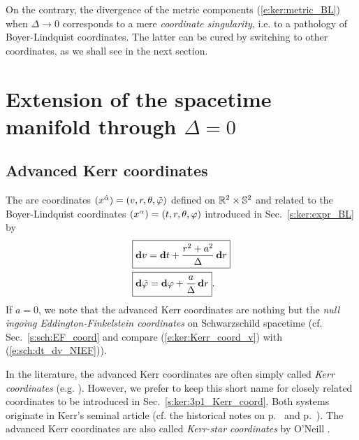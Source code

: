 On the contrary, the divergence
of the metric components (\ref{e:ker:metric_BL})
when $\Delta\rightarrow 0$ corresponds to
a mere \emph{coordinate singularity},
i.e. to a pathology of Boyer-Lindquist coordinates. The latter can be cured by switching to
other coordinates, as we shall see in the next section.


\section{Extension of the spacetime manifold through \texorpdfstring{$\Delta=0$}{Δ=0}}
\label{s:ker:extension}

\subsection{Advanced Kerr coordinates} \label{s:ker:Kerr_coord}

The  are coordinates
$(x^{\hat{\alpha}}) = (v,r,\theta,{\tilde\varphi})$ defined on $\mathbb{R}^2\times\mathbb{S}^2$ and related to the Boyer-Lindquist coordinates
$(x^\alpha) = (t,r,\theta,\varphi)$ introduced in Sec.~\ref{s:ker:expr_BL} by
\begin{subequations}
\label{e:ker:Kerr_coord}
\begin{align}
& \fbox{$\displaystyle \mathbf{d} v = \mathbf{d} t + \frac{r^2+a^2}{\Delta} \, \mathbf{d} r$} \label{e:ker:Kerr_coord_v}\\
& \fbox{$\displaystyle \mathbf{d} {\tilde\varphi} = \mathbf{d} \varphi + \frac{a}{\Delta}\, \mathbf{d} r$} . \label{e:ker:Kerr_coord_tph}
\end{align}
\end{subequations}
If $a=0$, we note that the advanced Kerr coordinates are nothing but the
\emph{null ingoing Eddington-Finkelstein coordinates} on Schwarzschild spacetime
(cf. Sec.~\ref{s:sch:EF_coord} and compare
(\ref{e:ker:Kerr_coord_v}) with (\ref{e:sch:dt_dv_NIEF})).

\begin{remark}
In the literature, the advanced Kerr coordinates are often simply called \emph{Kerr coordinates} (e.g. \cite{MisneTW73,Strau13}). However,
we prefer to keep this short name for closely related coordinates to be introduced in Sec.~\ref{s:ker:3p1_Kerr_coord}.
Both systems originate in Kerr's seminal article \cite{Kerr63} (cf. the historical notes on p.~\pageref{h:ker:Kerr_coord}
and p.~\pageref{h:ker:coord_ti}).
The advanced Kerr coordinates are also called \emph{Kerr-star coordinates}
by O'Neill \cite{ONeil95}.
\end{remark}


